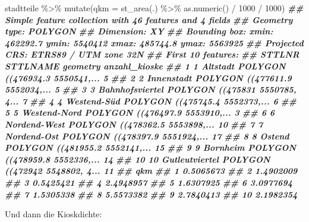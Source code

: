 \documentclass[
  ngerman,
]{article}
\newenvironment{Shaded}{\begin{snugshade}}{\end{snugshade}}
\newcommand{\AttributeTok}[1]{\textcolor[rgb]{0.77,0.63,0.00}{#1}}
\newcommand{\DecValTok}[1]{\textcolor[rgb]{0.00,0.00,0.81}{#1}}
\newcommand{\DocumentationTok}[1]{\textcolor[rgb]{0.56,0.35,0.01}{\textbf{\textit{#1}}}}
\newcommand{\FunctionTok}[1]{\textcolor[rgb]{0.00,0.00,0.00}{#1}}
\newcommand{\NormalTok}[1]{#1}
\newcommand{\SpecialCharTok}[1]{\textcolor[rgb]{0.00,0.00,0.00}{#1}}
\begin{document}
\begin{Shaded}
\begin{Highlighting}[]
\NormalTok{stadtteile }\SpecialCharTok{\%\textgreater{}\%}
  \FunctionTok{mutate}\NormalTok{(}\AttributeTok{qkm =} \FunctionTok{st\_area}\NormalTok{(.) }\SpecialCharTok{\%\textgreater{}\%} \FunctionTok{as.numeric}\NormalTok{() }\SpecialCharTok{/} \DecValTok{1000} \SpecialCharTok{/} \DecValTok{1000}\NormalTok{)}
\DocumentationTok{\#\# Simple feature collection with 46 features and 4 fields}
\DocumentationTok{\#\# Geometry type: POLYGON}
\DocumentationTok{\#\# Dimension:     XY}
\DocumentationTok{\#\# Bounding box:  xmin: 462292.7 ymin: 5540412 xmax: 485744.8 ymax: 5563925}
\DocumentationTok{\#\# Projected CRS: ETRS89 / UTM zone 32N}
\DocumentationTok{\#\# First 10 features:}
\DocumentationTok{\#\#    STTLNR        STTLNAME                       geometry anzahl\_kioske}
\DocumentationTok{\#\# 1       1        Altstadt POLYGON ((476934.3 5550541,...             5}
\DocumentationTok{\#\# 2       2      Innenstadt POLYGON ((477611.9 5552034,...             5}
\DocumentationTok{\#\# 3       3 Bahnhofsviertel POLYGON ((475831 5550785, 4...             7}
\DocumentationTok{\#\# 4       4     Westend{-}Süd POLYGON ((475745.4 5552373,...             6}
\DocumentationTok{\#\# 5       5    Westend{-}Nord POLYGON ((476497.9 5553910,...             3}
\DocumentationTok{\#\# 6       6    Nordend{-}West POLYGON ((478362.5 5553898,...            10}
\DocumentationTok{\#\# 7       7     Nordend{-}Ost POLYGON ((478397.9 5551924,...            17}
\DocumentationTok{\#\# 8       8          Ostend POLYGON ((481955.2 5552141,...            15}
\DocumentationTok{\#\# 9       9        Bornheim POLYGON ((478959.8 5552336,...            14}
\DocumentationTok{\#\# 10     10  Gutleutviertel POLYGON ((472942 5548802, 4...            11}
\DocumentationTok{\#\#          qkm}
\DocumentationTok{\#\# 1  0.5065673}
\DocumentationTok{\#\# 2  1.4902009}
\DocumentationTok{\#\# 3  0.5425421}
\DocumentationTok{\#\# 4  2.4948957}
\DocumentationTok{\#\# 5  1.6307925}
\DocumentationTok{\#\# 6  3.0977694}
\DocumentationTok{\#\# 7  1.5305338}
\DocumentationTok{\#\# 8  5.5573382}
\DocumentationTok{\#\# 9  2.7840413}
\DocumentationTok{\#\# 10 2.1982354}
\end{Highlighting}
\end{Shaded}

Und dann die Kioskdichte:
\end{document}
